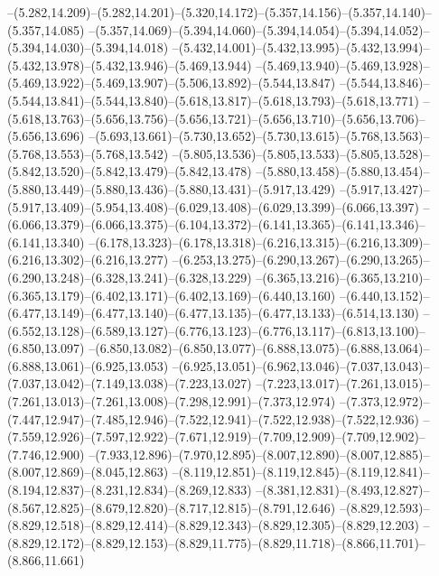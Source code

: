   --(5.282,14.209)--(5.282,14.201)--(5.320,14.172)--(5.357,14.156)--(5.357,14.140)--(5.357,14.085)%
  --(5.357,14.069)--(5.394,14.060)--(5.394,14.054)--(5.394,14.052)--(5.394,14.030)--(5.394,14.018)%
  --(5.432,14.001)--(5.432,13.995)--(5.432,13.994)--(5.432,13.978)--(5.432,13.946)--(5.469,13.944)%
  --(5.469,13.940)--(5.469,13.928)--(5.469,13.922)--(5.469,13.907)--(5.506,13.892)--(5.544,13.847)%
  --(5.544,13.846)--(5.544,13.841)--(5.544,13.840)--(5.618,13.817)--(5.618,13.793)--(5.618,13.771)%
  --(5.618,13.763)--(5.656,13.756)--(5.656,13.721)--(5.656,13.710)--(5.656,13.706)--(5.656,13.696)%
  --(5.693,13.661)--(5.730,13.652)--(5.730,13.615)--(5.768,13.563)--(5.768,13.553)--(5.768,13.542)%
  --(5.805,13.536)--(5.805,13.533)--(5.805,13.528)--(5.842,13.520)--(5.842,13.479)--(5.842,13.478)%
  --(5.880,13.458)--(5.880,13.454)--(5.880,13.449)--(5.880,13.436)--(5.880,13.431)--(5.917,13.429)%
  --(5.917,13.427)--(5.917,13.409)--(5.954,13.408)--(6.029,13.408)--(6.029,13.399)--(6.066,13.397)%
  --(6.066,13.379)--(6.066,13.375)--(6.104,13.372)--(6.141,13.365)--(6.141,13.346)--(6.141,13.340)%
  --(6.178,13.323)--(6.178,13.318)--(6.216,13.315)--(6.216,13.309)--(6.216,13.302)--(6.216,13.277)%
  --(6.253,13.275)--(6.290,13.267)--(6.290,13.265)--(6.290,13.248)--(6.328,13.241)--(6.328,13.229)%
  --(6.365,13.216)--(6.365,13.210)--(6.365,13.179)--(6.402,13.171)--(6.402,13.169)--(6.440,13.160)%
  --(6.440,13.152)--(6.477,13.149)--(6.477,13.140)--(6.477,13.135)--(6.477,13.133)--(6.514,13.130)%
  --(6.552,13.128)--(6.589,13.127)--(6.776,13.123)--(6.776,13.117)--(6.813,13.100)--(6.850,13.097)%
  --(6.850,13.082)--(6.850,13.077)--(6.888,13.075)--(6.888,13.064)--(6.888,13.061)--(6.925,13.053)%
  --(6.925,13.051)--(6.962,13.046)--(7.037,13.043)--(7.037,13.042)--(7.149,13.038)--(7.223,13.027)%
  --(7.223,13.017)--(7.261,13.015)--(7.261,13.013)--(7.261,13.008)--(7.298,12.991)--(7.373,12.974)%
  --(7.373,12.972)--(7.447,12.947)--(7.485,12.946)--(7.522,12.941)--(7.522,12.938)--(7.522,12.936)%
  --(7.559,12.926)--(7.597,12.922)--(7.671,12.919)--(7.709,12.909)--(7.709,12.902)--(7.746,12.900)%
  --(7.933,12.896)--(7.970,12.895)--(8.007,12.890)--(8.007,12.885)--(8.007,12.869)--(8.045,12.863)%
  --(8.119,12.851)--(8.119,12.845)--(8.119,12.841)--(8.194,12.837)--(8.231,12.834)--(8.269,12.833)%
  --(8.381,12.831)--(8.493,12.827)--(8.567,12.825)--(8.679,12.820)--(8.717,12.815)--(8.791,12.646)%
  --(8.829,12.593)--(8.829,12.518)--(8.829,12.414)--(8.829,12.343)--(8.829,12.305)--(8.829,12.203)%
  --(8.829,12.172)--(8.829,12.153)--(8.829,11.775)--(8.829,11.718)--(8.866,11.701)--(8.866,11.661)%
